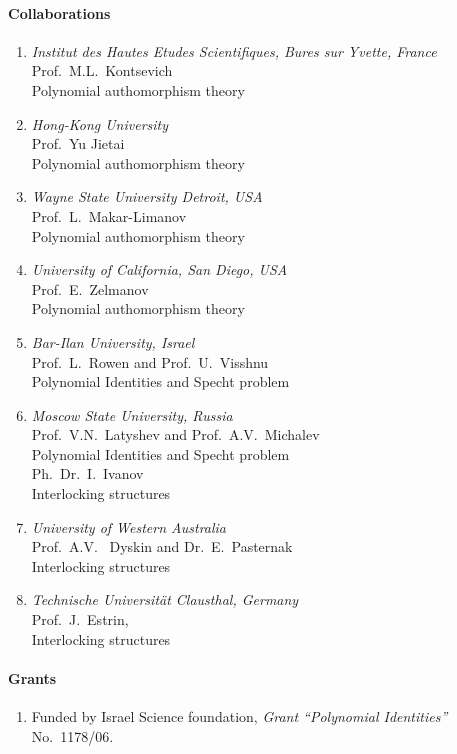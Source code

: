 \paragraph{Collaborations}
\begin{enumerate}
\item {\sl Institut des Hautes Etudes Scientifiques, Bures sur Yvette, France}\\
  Prof.~M.L.~Kontsevich \\
  Polynomial authomorphism theory
\item {\sl Hong-Kong University} \\
  Prof.~Yu Jietai \\
  Polynomial authomorphism theory
\item {\sl Wayne State University Detroit, USA} \\
  Prof.~L.~Makar-Limanov \\
  Polynomial authomorphism theory
\item {\sl University of California, San Diego, USA} \\
  Prof.~E.~Zelmanov \\
  Polynomial authomorphism theory
\item {\sl Bar-Ilan University, Israel} \\
  Prof.~L.~Rowen and Prof.~U.~Visshnu\\
  Polynomial Identities and Specht problem
\item {\sl Moscow State University, Russia} \\
  Prof.~V.N.~Latyshev and Prof.~A.V.~Michalev \\
  Polynomial Identities and Specht problem \\
  Ph.~Dr.~I.~Ivanov \\
  Interlocking structures
\item {\sl University of Western Australia} \\
  Prof.~A.V.~ Dyskin and Dr.~E.~Pasternak \\
  Interlocking structures
\item {\sl  Technische Universit\"at Clausthal, Germany} \\
  Prof.~J.~Estrin, \\
  Interlocking structures
\end{enumerate}

\paragraph{Grants}
\begin{enumerate}
\item Funded by Israel Science foundation, \emph{ Grant
``Polynomial Identities''}
      No.~1178/06.
\end{enumerate}

\nocite{Belov5}
\nocite{Belov7}

%
